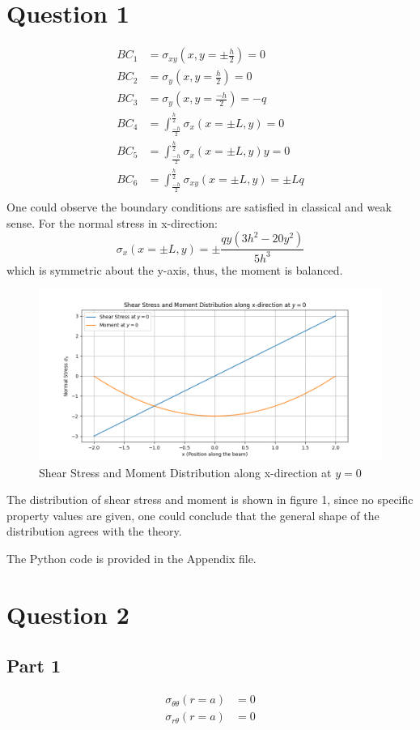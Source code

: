 \documentclass[12pt]{article} %
\begin{document}
\section{Question 1}
\begin{align*}
    BC_1 &= \sigma_{xy}(x,y=\pm \frac{h}{2}) = 0\\
    BC_2 &= \sigma_{y}(x,y=\frac{h}{2}) = 0\\
    BC_3 &= \sigma_{y}(x,y=\frac{-h}{2}) = -q\\
    BC_4 &= \int_{\frac{-h}{2}}^{\frac{h}{2}} \sigma_x(x=\pm L,y) = 0 \\
    BC_5 &= \int_{\frac{-h}{2}}^{\frac{h}{2}} \sigma_x(x=\pm L,y)y = 0 \\
    BC_6 &= \int_{\frac{-h}{2}}^{\frac{h}{2}} \sigma_{xy}(x=\pm L,y) = \pm Lq \\
\end{align*}
One could observe the boundary conditions are satisfied in classical and weak sense. For the normal stress in x-direction:
\[ \sigma_x(x=\pm L,y) = \pm \frac{q y \left(3 h^{2} - 20 y^{2}\right)}{5 h^{3}} \] which is symmetric about the y-axis, thus, the moment is balanced.
\begin{figure}[ht]
    \centering
    \includegraphics[width=1\textwidth]{Q1.png}
    \caption{Shear Stress and Moment Distribution along x-direction at $y=0$}
\end{figure}
The distribution of shear stress and moment is shown in figure 1, since no specific property values are given, one could conclude
that the general shape of the distribution agrees with the theory.

The Python code is provided in the Appendix file.

\section{Question 2}
\subsection*{Part 1}
\begin{align*}
    \sigma_{\theta\theta}(r=a) &= 0\\
    \sigma_{r\theta}(r=a) &= 0\\
\end{align*}
\end{document}
